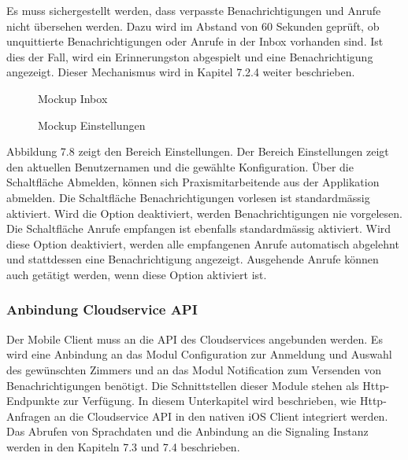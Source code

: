 Es muss sichergestellt werden, dass verpasste Benachrichtigungen und Anrufe nicht übersehen werden.
Dazu wird im Abstand von 60 Sekunden geprüft, ob unquittierte Benachrichtigungen oder Anrufe in der Inbox vorhanden sind.
Ist dies der Fall, wird ein Erinnerungston abgespielt und eine Benachrichtigung angezeigt.
Dieser Mechanismus wird in Kapitel 7.2.4 weiter beschrieben.

\begin{figure}[h]
    \centering
    \begin{minipage}[b]{0.4\textwidth}
        \caption{Mockup Inbox}
    \end{minipage}
    \hfill
    \begin{minipage}[b]{0.4\textwidth}
        \caption{Mockup Einstellungen}
    \end{minipage}\label{fig:Mockups-Inbox-Settings}
\end{figure}

Abbildung 7.8 zeigt den Bereich Einstellungen.
Der Bereich Einstellungen zeigt den aktuellen Benutzernamen und die gewählte Konfiguration.
Über die Schaltfläche Abmelden, können sich Praxismitarbeitende aus der Applikation abmelden.
Die Schaltfläche Benachrichtigungen vorlesen ist standardmässig aktiviert.
Wird die Option deaktiviert, werden Benachrichtigungen nie vorgelesen.
Die Schaltfläche Anrufe empfangen ist ebenfalls standardmässig aktiviert.
Wird diese Option deaktiviert, werden alle empfangenen Anrufe automatisch abgelehnt und stattdessen eine Benachrichtigung angezeigt.
Ausgehende Anrufe können auch getätigt werden, wenn diese Option aktiviert ist.

\subsubsection{Anbindung Cloudservice API}

Der Mobile Client muss an die API des Cloudservices angebunden werden.
Es wird eine Anbindung an das Modul Configuration zur Anmeldung und Auswahl des gewünschten Zimmers und an das Modul Notification zum Versenden von Benachrichtigungen benötigt.
Die Schnittstellen dieser Module stehen als Http-Endpunkte zur Verfügung.
In diesem Unterkapitel wird beschrieben, wie Http-Anfragen an die Cloudservice API in den nativen iOS Client integriert werden.
Das Abrufen von Sprachdaten und die Anbindung an die Signaling Instanz werden in den Kapiteln 7.3 und 7.4 beschrieben.

